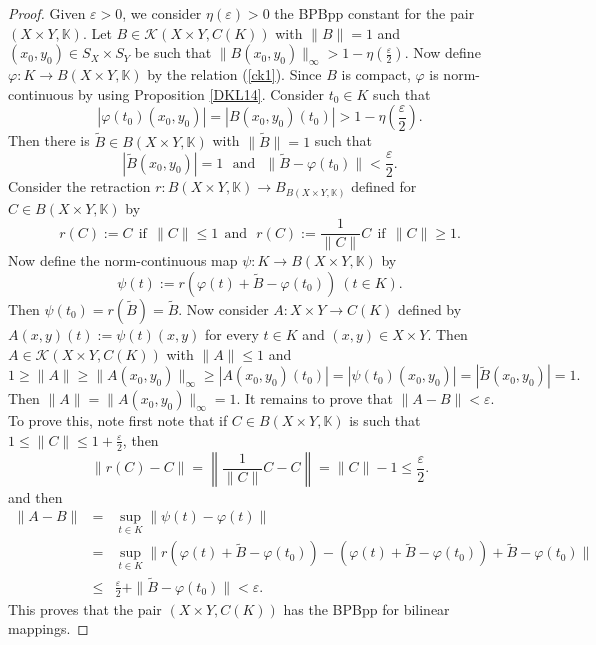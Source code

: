 \documentclass[12pt,a4paper]{amsart}
\theoremstyle{definition}
\newcommand{\e}{\varepsilon}
\numberwithin{equation}{section}
\newcommand{\K}{\mathbb{K}} %
\def\K{{\mathbb K}}
\begin{document}
\begin{proof} Given $\e > 0$, we consider $\eta(\e) > 0$ the BPBpp constant for the pair $(X \times Y, \K)$. Let $B \in \mathcal{K}(X \times Y, C(K))$ with $\|B\| = 1$ and $(x_0, y_0) \in S_X \times S_Y$ be such that $\|B(x_0, y_0)\|_{\infty} > 1 -\eta \left(\frac{\e}{2}\right)$. Now define $\varphi: K \longrightarrow B (X \times Y, \K)$ by the relation (\ref{ck1}). Since $B$ is compact, $\varphi$ is norm-continuous by using Proposition \ref{DKL14}. Consider $t_0 \in K$ such that
\begin{equation*}
|\varphi(t_0)(x_0, y_0)| = |B(x_0, y_0)(t_0)| > 1 - \eta\left(\frac{\e}{2}\right).
\end{equation*}
Then there is $\widetilde{B} \in B (X \times Y, \K)$ with $\|\widetilde{B}\| = 1$ such that
\begin{equation*}
|\widetilde{B}(x_0, y_0)| = 1 \ \ \ \mbox{and} \ \ \ \|\widetilde{B} - \varphi(t_0)\| < \frac{\e}{2}.
\end{equation*} 
Consider the retraction $r: B (X \times Y, \K) \longrightarrow B_{B (X \times Y, \K)}$ defined for $C \in B (X \times Y, \K)$ by
\begin{equation*}
r(C) := C \ \ \mbox{if} \ \ \|C\| \leq 1 \ \ \mbox{and} \ \ \ r(C) := \frac{1}{\|C\|} C \ \ \mbox{if} \ \ \|C\| \geq 1.
\end{equation*}
Now define the norm-continuous map $\psi: K \longrightarrow B (X \times Y, \K)$ by
\begin{equation*}
\psi(t) := r (\varphi(t) + \widetilde{B} - \varphi(t_0)) \ (t \in K).
\end{equation*}
Then $\psi (t_0) = r(\widetilde{B}) = \widetilde{B}$. Now consider $A: X \times Y \longrightarrow C(K)$ defined by $A(x, y)(t) := \psi(t)(x, y)$ for every $t \in K$ and $(x, y) \in X \times Y$. Then $A \in \mathcal{K}(X \times Y, C(K))$ with $\|A\| \leq 1$ and 
\begin{equation*}
1 \geq \|A\| \geq \|A(x_0, y_0)\|_{\infty} \geq |A(x_0, y_0)(t_0)| = |\psi(t_0)(x_0, y_0)| = |\widetilde{B}(x_0, y_0)| = 1.
\end{equation*}
Then $\|A\| = \|A(x_0, y_0)\|_{\infty} = 1$. It remains to prove that $\|A - B\| < \e$. To prove this, note first note that if $C \in B (X \times Y, \K)$ is such that $1 \leq \|C\| \leq 1 + \frac{\e}{2}$, then
\begin{equation*}
\|r(C) - C\| = \left\| \frac{1}{\|C\|}C - C \right\| = \|C\| - 1 \leq \frac{\e}{2}.
\end{equation*}
and then
\begin{eqnarray*}
\|A - B\| &=& \sup_{t \in K} \|\psi(t) - \varphi(t)\| \\
&=& \sup_{t \in K} \| r(\varphi(t) + \widetilde{B} - \varphi(t_0)) - (\varphi(t) + \widetilde{B} - \varphi(t_0)) + \widetilde{B} - \varphi(t_0)\| \\
&\leq& \frac{\e}{2} + \|\widetilde{B} - \varphi(t_0)\| < \e.
\end{eqnarray*}
This proves that the pair $(X \times Y, C(K))$ has the BPBpp for bilinear mappings.
	
\end{proof}
\end{document}
